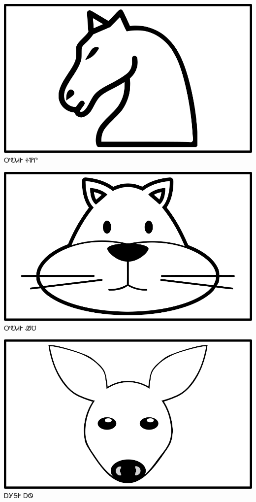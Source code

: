 \documentclass[avery5371]{flashcards}%
\begin{document}
    \begin{flashcard}{
        \includegraphics[width=0.95\columnwidth,height=.51\columnwidth,keepaspectratio]{../artwork/objects-animate/soquili}
    }
        \Huge ᎤᏬᏗᎨ ᏐᏈᎵ
    \end{flashcard}

    \begin{flashcard}{
        \includegraphics[width=0.95\columnwidth,height=.51\columnwidth,keepaspectratio]{../artwork/objects-animate/wesa}
    }
        \Huge ᎤᏬᏗᎨ ᏪᏌ
    \end{flashcard}

    \begin{flashcard}{
        \includegraphics[width=0.95\columnwidth,height=.51\columnwidth,keepaspectratio]{../artwork/objects-animate/ahwi}
    }
        \Huge ᎠᎩᎦᎨ ᎠᏫ
    \end{flashcard}
\end{document}
